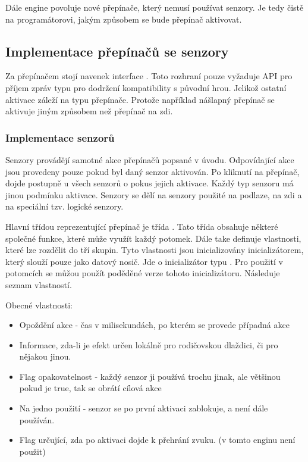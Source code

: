 Dále engine povoluje nové přepínače, který nemusí používat senzory. Je tedy čistě na programátorovi, jakým 
způsobem se bude přepínač aktivovat. 

\subsection{Implementace přepínačů se senzory}
Za přepínačem stojí navenek interface . Toto rozhraní pouze vyžaduje API pro příjem 
zpráv typu   pro dodržení kompatibility s původní hrou. Jelikož ostatní aktivace záleží
na typu přepínače. Protože například nášlapný přepínač se aktivuje jiným způsobem než přepínač na zdi.

\subsubsection{Implementace senzorů}
Senzory provádějí samotné akce přepínačů popsané v úvodu. Odpovídající akce jsou provedeny pouze pokud
byl daný senzor aktivován. Po kliknutí na přepínač, dojde postupně u všech senzorů o pokus jejich aktivace.
Každý typ senzoru má jinou podmínku aktivace. Senzory se dělí na senzory použité na podlaze,  na zdi a
na speciální tzv. logické senzory.

Hlavní třídou reprezentující přepínač je třída . Tato třída obsahuje některé společné funkce,
které může využít každý potomek. Dále take definuje vlastnosti, které lze rozdělit do tří skupin.
Tyto vlastnosti jsou inicializovány inicializátorem, který slouží pouze jako datový nosič. Jde o inicializátor
typu . Pro použití v potomcích se můžou použít poděděné verze tohoto inicializátoru.
Následuje seznam vlastností.

Obecné vlastnosti:
\begin{itemize}
\item Opoždění akce - čas v milisekundách, po kterém se provede případná akce 
\item Informace, zda-li je efekt určen lokálně pro rodičovskou dlaždici, či pro nějakou jinou.
\item Flag opakovatelnost - každý senzor ji používá trochu jinak, ale většinou pokud je true, tak se obrátí cílová akce
\item Na jedno použití - senzor se po první aktivaci zablokuje, a není dále používán.
\item Flag určující, zda po aktivaci dojde k přehrání zvuku. (v tomto enginu není použit)
\end{itemize}

